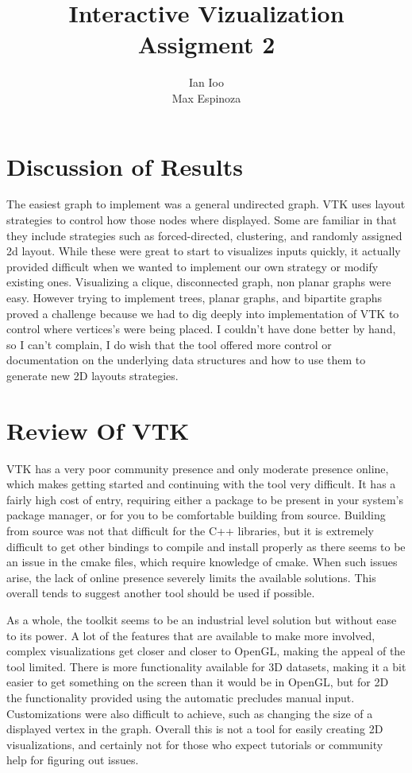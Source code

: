 \documentclass[11pt]{article}
\title{\textbf{Interactive Vizualization}
\\
\normalsize{Assigment 2}
}
\author{Ian Ioo\\
		Max Espinoza}
\begin{document}
\maketitle


\section{Discussion of Results}

The easiest graph to implement was a general undirected graph. VTK uses layout strategies to control how those nodes where displayed. Some are familiar in that they include strategies such as forced-directed, clustering, and randomly assigned 2d layout. While these were great to start to visualizes inputs quickly, it actually provided difficult when we wanted to implement our own strategy or modify existing ones. Visualizing a clique, disconnected graph, non planar graphs were easy. However trying to implement trees, planar graphs, and bipartite graphs proved a challenge because we had to dig deeply into implementation of VTK to control where vertices's were being placed. I couldn't have done better by hand, so I can't complain, I do wish that the tool offered more control or documentation on the underlying data structures and how to use them to generate new 2D layouts strategies.



\section{Review Of VTK}

    VTK has a very poor community presence and only moderate presence online, which makes getting started and continuing with the tool very difficult.  It has a fairly high cost of entry, requiring either a package to be present in your system's package manager, or for you to be comfortable building from source.  Building from source was not that difficult for the C++ libraries, but it is extremely difficult to get other bindings to compile and install properly as there seems to be an issue in the cmake files, which require knowledge of cmake.  When such issues arise, the lack of online presence severely limits the available solutions.  This overall tends to suggest another tool should be used if possible.

    As a whole, the toolkit seems to be an industrial level solution but without ease to its power.  A lot of the features that are available to make more involved, complex visualizations get closer and closer to OpenGL, making the appeal of the tool limited.  There is more functionality available for 3D datasets, making it a bit easier to get something on the screen than it would be in OpenGL, but for 2D the functionality provided using the automatic precludes manual input.  Customizations were also difficult to achieve, such as changing the size of a displayed vertex in the graph.  Overall this is not a tool for easily creating 2D visualizations, and certainly not for those who expect tutorials or community help for figuring out issues.
\end{document}
